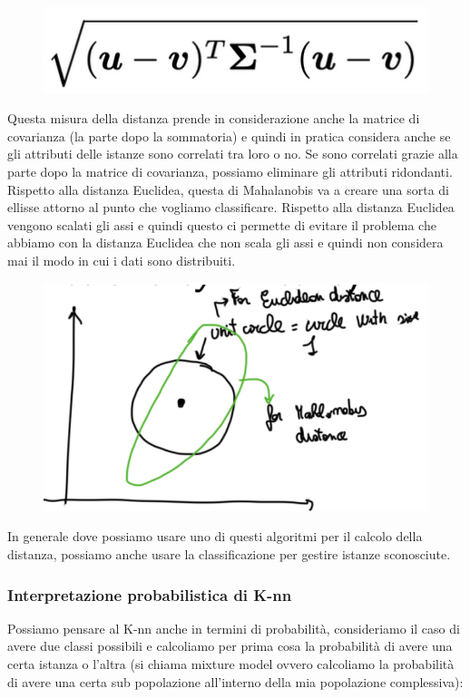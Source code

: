 \documentclass[14pt]{extreport}
\begin{document}
\begin{itemize}
	      \begin{figure}[H]
		      \centering
		      \includegraphics[width=0.7\linewidth]{464.jpeg}
	      \end{figure}
	      Questa misura della distanza prende in considerazione anche la matrice di covarianza (la parte dopo la sommatoria) e quindi in pratica
	      considera anche se gli attributi delle istanze sono correlati tra loro o no. Se sono correlati grazie alla parte dopo la matrice di
	      covarianza, possiamo eliminare gli attributi ridondanti. Rispetto alla distanza Euclidea, questa di Mahalanobis va a creare una sorta di
	      ellisse attorno al punto che vogliamo classificare. Rispetto alla distanza Euclidea vengono scalati gli assi e quindi questo ci permette di
	      evitare il problema che abbiamo con la distanza Euclidea che non scala gli assi e quindi non considera mai il modo in cui i dati sono
	      distribuiti.

\end{itemize}


\begin{figure}[H]
	\centering
	\includegraphics[width=0.7\linewidth]{467.jpeg}
\end{figure}
In generale dove possiamo usare uno di questi algoritmi per il calcolo della distanza, possiamo anche usare la classificazione per gestire istanze
sconosciute.

\subsubsection{Interpretazione probabilistica di K-nn}

Possiamo pensare al K-nn anche in termini di probabilità, consideriamo il caso di avere due classi possibili e calcoliamo per prima cosa la
probabilità di avere una certa istanza o l’altra (si chiama mixture model ovvero calcoliamo la probabilità di avere una certa sub popolazione
all’interno della mia popolazione complessiva):
\end{document}

